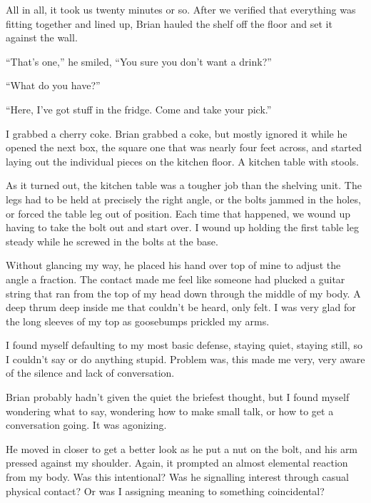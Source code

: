 All in all, it took us twenty minutes or so.  After we verified that everything was fitting together and lined up, Brian hauled the shelf off the floor and set it against the wall.



``That's one,'' he smiled, ``You sure you don't want a drink?''



``What do you have?''



``Here, I've got stuff in the fridge.  Come and take your pick.''



I grabbed a cherry coke.  Brian grabbed a coke, but mostly ignored it while he opened the next box, the square one that was nearly four feet across, and started laying out the individual pieces on the kitchen floor.  A kitchen table with stools.



As it turned out, the kitchen table was a tougher job than the shelving unit.  The legs had to be held at precisely the right angle, or the bolts jammed in the holes, or forced the table leg out of position.  Each time that happened, we wound up having to take the bolt out and start over.  I wound up holding the first table leg steady while he screwed in the bolts at the base.



Without glancing my way, he placed his hand over top of mine to adjust the angle a fraction.  The contact made me feel like someone had plucked a guitar string that ran from the top of my head down through the middle of my body.  A deep thrum deep inside me that couldn't be heard, only felt.  I was very glad for the long sleeves of my top as goosebumps prickled my arms.



I found myself defaulting to my most basic defense, staying quiet, staying still, so I couldn't say or do anything stupid.  Problem was, this made me very, very aware of the silence and lack of conversation.



Brian probably hadn't given the quiet the briefest thought, but I found myself wondering what to say, wondering how to make small talk, or how to get a conversation going.  It was agonizing.



He moved in closer to get a better look as he put a nut on the bolt, and his arm pressed against my shoulder.  Again, it prompted an almost elemental reaction from my body.  Was this intentional?  Was he signalling interest through casual physical contact?  Or was I assigning meaning to something coincidental?



